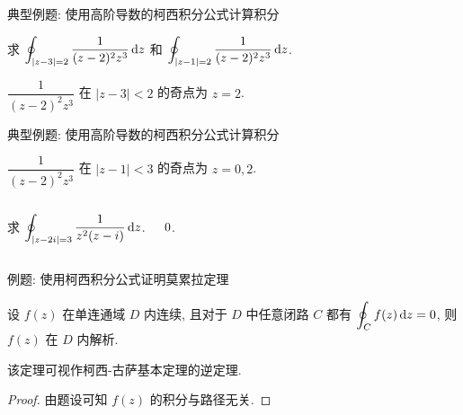 \begin{frame}{典型例题: 使用高阶导数的柯西积分公式计算积分}
\onslide<+->
\begin{example}
求 $\displaystyle\oint_{|z-3|=2}\frac1{(z-2)^2z^3}\,\mathrm{d} z$ 和 $\displaystyle\oint_{|z-1|=2}\frac1{(z-2)^2z^3}\,\mathrm{d} z$.
\end{example}
\onslide<+->
\begin{solution}
 $\dfrac1{(z-2)^2z^3}$ 在 $|z-3|<2$ 的奇点为 $z=2$.
\onslide<+->{由柯西积分公式,
\[\oint_{|z-3|=2}\frac1{(z-2)^2z^3}\diff z
	=\frac{2\pi i}{1!}\left(\frac1{z^3}\right)'\bigg|_{z=2}
	=-\frac{3\pi i}8.\]}
\end{solution}
\end{frame}


\begin{frame}[<*>]{典型例题: 使用高阶导数的柯西积分公式计算积分}
\onslide<+->
\begin{solutionc}
 $\dfrac1{(z-2)^2z^3}$ 在 $|z-1|<3$ 的奇点为 $z=0,2$.
\end{solutionc}
\onslide<+->
\begin{columns}
		\begin{exercise}
		求 $\displaystyle\oint_{|z-2i|=3}\frac1{z^2(z-i)}\,\mathrm{d} z$.
		\end{exercise}\onslide<+->
		\begin{answer}
		$0\vphantom{\displaystyle\oint_{|z-2i|=3}\frac1{z^2(z-i)}\diff z}$.
		\end{answer}
\end{columns}
\end{frame}


\begin{frame}{例题: 使用柯西积分公式证明莫累拉定理}
\onslide<+->
\begin{example}[莫累拉定理]
设 $f(z)$ 在单连通域 $D$ 内连续, 且对于 $D$ 中任意闭路 $C$ 都有 $\displaystyle\oint_Cf(z)\,\mathrm{d} z=0$, 则 $f(z)$ 在 $D$ 内解析.
\end{example}
\onslide<+->
该定理可视作柯西-古萨基本定理的逆定理.
\onslide<+->
\begin{proof}
由题设可知 $f(z)$ 的积分与路径无关.
\end{proof}
\end{frame}


